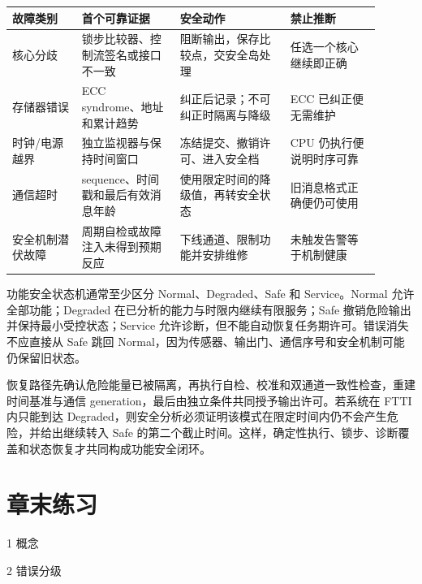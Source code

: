 \begin{longtable}{L{0.17\linewidth}L{0.24\linewidth}L{0.27\linewidth}L{0.22\linewidth}}
\toprule
故障类别 & 首个可靠证据 & 安全动作 & 禁止推断 \\
\midrule
核心分歧 & 锁步比较器、控制流签名或接口不一致 & 阻断输出，保存比较点，交安全岛处理 & 任选一个核心继续即正确 \\\tablerowrule
存储器错误 & ECC syndrome、地址和累计趋势 & 纠正后记录；不可纠正时隔离与降级 & ECC 已纠正便无需维护 \\\tablerowrule
时钟/电源越界 & 独立监视器与保持时间窗口 & 冻结提交、撤销许可、进入安全档 & CPU 仍执行便说明时序可靠 \\\tablerowrule
通信超时 & sequence、时间戳和最后有效消息年龄 & 使用限定时间的降级值，再转安全状态 & 旧消息格式正确便仍可使用 \\\tablerowrule
安全机制潜伏故障 & 周期自检或故障注入未得到预期反应 & 下线通道、限制功能并安排维修 & 未触发告警等于机制健康 \\
\bottomrule
\end{longtable}


功能安全状态机通常至少区分 Normal、Degraded、Safe 和 Service。Normal 允许全部功能；Degraded 在已分析的能力与时限内继续有限服务；Safe 撤销危险输出并保持最小受控状态；Service 允许诊断，但不能自动恢复任务期许可。错误消失不应直接从 Safe 跳回 Normal，因为传感器、输出门、通信序号和安全机制可能仍保留旧状态。

恢复路径先确认危险能量已被隔离，再执行自检、校准和双通道一致性检查，重建时间基准与通信 generation，最后由独立条件共同授予输出许可。若系统在 FTTI 内只能到达 Degraded，则安全分析必须证明该模式在限定时间内仍不会产生危险，并给出继续转入 Safe 的第二个截止时间。这样，确定性执行、锁步、诊断覆盖和状态恢复才共同构成功能安全闭环。

\section*{章末练习}

\begin{chapterexercise}{1}
概念
\end{chapterexercise}

\begin{chapterexercise}{2}
错误分级
\end{chapterexercise}

